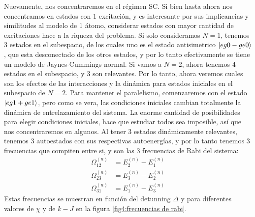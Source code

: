 Nuevamente, nos concentraremos en el régimen SC. Si bien hasta ahora nos concentramos en estados con 1 excitación, y es interesante por sus implicancias y similitudes al modelo de 1 átomo, considerar estados con mayor cantidad de excitaciones hace a la riqueza del problema. Si solo consideramos $N=1$, tenemos 3 estados en el subespacio, de los cuales uno es el estado antisimetrico $\ket{eg0-ge0}$, que esta desconectado de los otros estados, y por lo tanto efectivamente se tiene un modelo de Jaynes-Cummings normal. Si vamos a $N=2$, ahora tenemos 4 estados en el subespacio, y 3 son relevantes. Por lo tanto, ahora veremos cuales son los efectos de las interacciones y la dinámica para estados iniciales en el subespacio de $N=2$. Para mantener el paralelismo, comenzaremos con el estado $\ket{eg1+ge1}$, pero como se vera, las condiciones iniciales cambian totalmente la dinámica de entrelazamiento del sistema. La enorme cantidad de posibilidades para elegir condiciones iniciales, hace que estudiar todos sea imposible, así que nos concentraremos en algunos.
Al tener 3 estados dinámicamente relevantes, tenemos 3 autoestados con sus respectivas autoenergías, y por lo tanto tenemos 3 frecuencias que compiten entre si, y son las 3 frecuencias de Rabi del sistema:
\begin{equation}
    \begin{aligned}
        \Omega^{(n)}_{12} &= E^{(n)}_2-E^{(n)}_1 \\
        \Omega^{(n)}_{23} &=E^{(n)}_3-E^{(n)}_2 \\
        \Omega^{(n)}_{31} &= E^{(n)}_1-E^{(n)}_3         
    \end{aligned}
    \label{ec4:frecuencias de rabi}
\end{equation}
Estas frecuencias se muestran en función del detunning $\Delta$ y para diferentes valores de $\chi$ y de $k-J$ en la figura \ref{fig4:frecuencias de rabi}.
